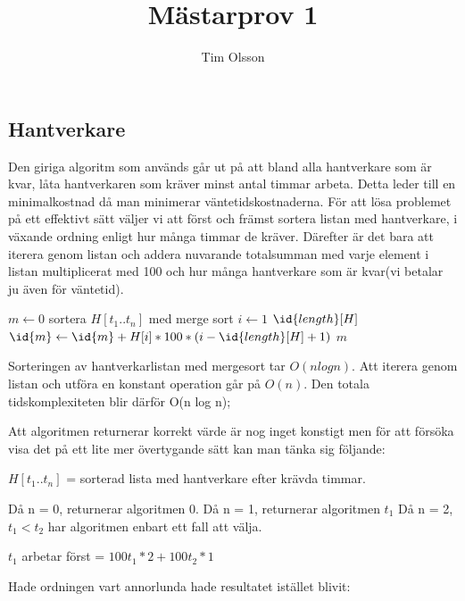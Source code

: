 \documentclass[11pt,a4paper,article,oneside]{memoir}
\author{Tim Olsson}
\title{Mästarprov 1}
\begin{document}
\maketitle

\newpage

\subsection{Hantverkare}

Den giriga algoritm som används går ut på att bland alla hantverkare som är kvar, låta 
hantverkaren som kräver minst antal timmar arbeta. Detta leder till en minimalkostnad 
då man minimerar väntetidskostnaderna. För att lösa problemet på ett effektivt sätt väljer vi att 
först och främst sortera listan med hantverkare, i växande ordning enligt hur många timmar 
de kräver. Därefter är det bara att iterera genom listan och addera nuvarande totalsumman med 
varje element i listan multiplicerat med 100 och hur många hantverkare som är kvar(vi betalar ju 
även för väntetid).

\begin{codebox}
\zi $m \gets 0$
\zi sortera $H[t_1..t_n]$ med merge sort
\zi \For $i \gets 1$ \To $\id{length} [H] $
\zi    \Do  $\id{m}  \gets \id{m} + H[i]*100*(i- \id{length} [H]+1) $
\End
\zi \Return $m$

\end{codebox}

Sorteringen av hantverkarlistan med mergesort tar $O(n log n)$. Att iterera genom listan och utföra
en konstant operation går på $O(n)$. Den totala tidskomplexiteten blir därför O(n log n);

Att algoritmen returnerar korrekt värde är nog inget konstigt 
men för att försöka visa det på ett lite mer övertygande sätt kan man tänka sig följande: 

$H[t_1..t_n]$ = sorterad lista med hantverkare efter krävda timmar.

Då n = 0, returnerar algoritmen 0. \newline
Då n = 1, returnerar algoritmen $t_1$ \newline
Då n = 2, $t_1 < t_2$ har algoritmen enbart ett fall att välja.

$t_1$ arbetar först = $100t_1*2 + 100t_2*1$ 

Hade ordningen vart annorlunda hade resultatet istället blivit: 
\end{document}
